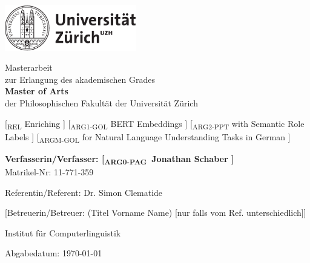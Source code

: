 \begin{titlepage}
\includegraphics[height=20mm]{images/uzh_logo_d_pos}\\

\begin{center}

{\sffamily
Masterarbeit \\
zur Erlangung des akademischen Grades \\
\textbf{Master of Arts} \\
der Philosophischen Fakultät der Universität Zürich \\

\vspace{2cm}

{\Large {\color{light-gray} [\textsubscript{REL}} Enriching{\color{light-gray} ]}
        {\color{light-gray} [\textsubscript{ARG1-GOL}} BERT Embeddings{\color{light-gray} ]}
        {\color{light-gray} [\textsubscript{ARG2-PPT}} with Semantic Role Labels{\color{light-gray} ]}
        {\color{light-gray} [\textsubscript{ARGM-GOL}} for Natural Language Understanding Tasks in German{\color{light-gray} ]}
}\\

\vspace{4cm}

\textbf{Verfasserin/Verfasser: {\color{light-gray} [\textsubscript{ARG0-PAG}} Jonathan Schaber{\color{light-gray} ]}} \\
	Matrikel-Nr: 11-771-359 \\

\vspace{2cm}

Referentin/Referent: Dr. Simon Clematide

[Betreuerin/Betreuer: (Titel Vorname Name) {\small [nur falls vom Ref. unterschiedlich]}]

Institut f\"ur Computerlinguistik

\vfill Abgabedatum: \today

\vspace{3cm}
}
\end{center}

\end{titlepage}

\newpage
